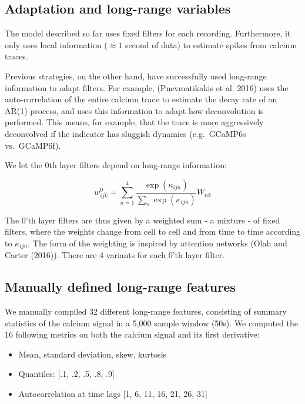 \documentclass[]{article}
\providecommand{\tightlist}{%
  \setlength{\itemsep}{0pt}\setlength{\parskip}{0pt}}
\begin{document}
\subsection{Adaptation and long-range
variables}\label{adaptation-and-long-range-variables}

The model described so far uses fixed filters for each recording.
Furthermore, it only uses local information (\(\approx 1\) second of
data) to estimate spikes from calcium traces.

Previous strategies, on the other hand, have successfully used
long-range information to adapt filters. For example, (Pnevmatikakis et
al. 2016) uses the auto-correlation of the entire calcium trace to
estimate the decay rate of an AR(1) process, and uses this information
to adapt how deconvolution is performed. This means, for example, that
the trace is more aggressively deconvolved if the indicator has sluggish
dynamics (e.g.~GCaMP6s vs.~GCaMP6f).

We let the \(0\)th layer filters depend on long-range information:

\[w^0_{ijk} = \sum_{n=1}^4 \frac{\exp(\kappa_{ijn})}{\sum_n \exp(\kappa_{ijn})} W_{nk}\]

The 0'th layer filters are thus given by a weighted sum - a mixture - of
fixed filters, where the weights change from cell to cell and from time
to time according to \(\kappa_{ijn}\). The form of the weighting is
inspired by attention networks (Olah and Carter (2016)). There are 4
variants for each 0'th layer filter.

\subsection{Manually defined long-range
features}\label{manually-defined-long-range-features}

We manually compiled 32 different long-range features, consisting of
summary statistics of the calcium signal in a 5,000 sample window (50s).
We computed the 16 following metrics on both the calcium signal and its
first derivative:

\begin{itemize}
\tightlist
\item
  Mean, standard deviation, skew, kurtosis
\item
  Quantiles: {[}.1, .2, .5, .8, .9{]}
\item
  Autocorrelation at time lags {[}1, 6, 11, 16, 21, 26, 31{]}
\end{itemize}
\end{document}
